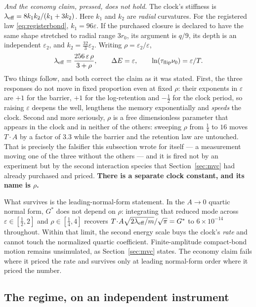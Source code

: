 \documentclass[11pt,a4paper]{article}
\newcommand{\Gstar}{{G^{*}}}
\theoremstyle{definition}
\theoremstyle{plain}
\theoremstyle{remark}
\begin{document}
\emph{And the economy claim, pressed, does not hold.} The clock's
stiffness is $\lambda_{\rm eff}=8k_1k_2/(k_1+3k_2)$. Here $k_1$ and
$k_2$ are \emph{radial} curvatures. For the registered law
\eqref{eq:registerbond}, $k_1=96\varepsilon$. If the purchased closure is
declared to have the same shape stretched to radial range $3r_0$, its
argument is $q/9$, its depth is an independent $\varepsilon_2$, and
$k_2=\tfrac{32}{3}\varepsilon_2$. Writing
$\rho=\varepsilon_2/\varepsilon$,
\begin{equation}
\lambda_{\rm eff} = \frac{256\,\varepsilon\,\rho}{3+\rho},
\qquad
\Delta E = \varepsilon,
\qquad
\ln(\tau_{\rm flip}\nu_0) = \varepsilon/T .
\label{eq:economy}
\end{equation}
Two things follow, and both correct the claim as it was stated. First,
the three responses do not move in fixed proportion even at fixed $\rho$:
their exponents in $\varepsilon$ are $+1$ for the barrier, $+1$ for the
log-retention and $-\tfrac12$ for the clock period, so raising
$\varepsilon$ deepens the well, lengthens the memory exponentially and
\emph{speeds} the clock. Second and more seriously, $\rho$ is a free
dimensionless parameter that appears in the clock and in neither of the
others: sweeping $\rho$ from $\tfrac14$ to $16$ moves $T\!\cdot\!A$ by a
factor of $3.3$ while the barrier and the retention law are untouched.
That is precisely the falsifier this subsection wrote for itself --- a
measurement moving one of the three without the others --- and it is
fired not by an experiment but by the second interaction species that
Section~\ref{sec:mvc} had already purchased and priced. \textbf{There is
a separate clock constant, and its name is $\rho$.}

What survives is the leading-normal-form statement. In the $A\to0$
quartic normal form, $\Gstar$ does not depend on $\rho$: integrating that
reduced mode across
$\varepsilon\in[\tfrac12,2]$ and $\rho\in[\tfrac14,4]$ recovers
$T\!\cdot\!A\sqrt{2\lambda_{\rm eff}/m}/\sqrt\pi = \Gstar$ to
$6\times10^{-14}$ throughout. Within that limit, the second energy scale
buys the clock's \emph{rate} and cannot touch the normalized quartic
coefficient. Finite-amplitude compact-bond motion remains unsimulated, as
Section~\ref{sec:mvc} states. The economy claim fails where it priced the
rate and survives only at leading normal-form order where it priced the
number.

\subsection{The regime, on an independent instrument}
\end{document}
